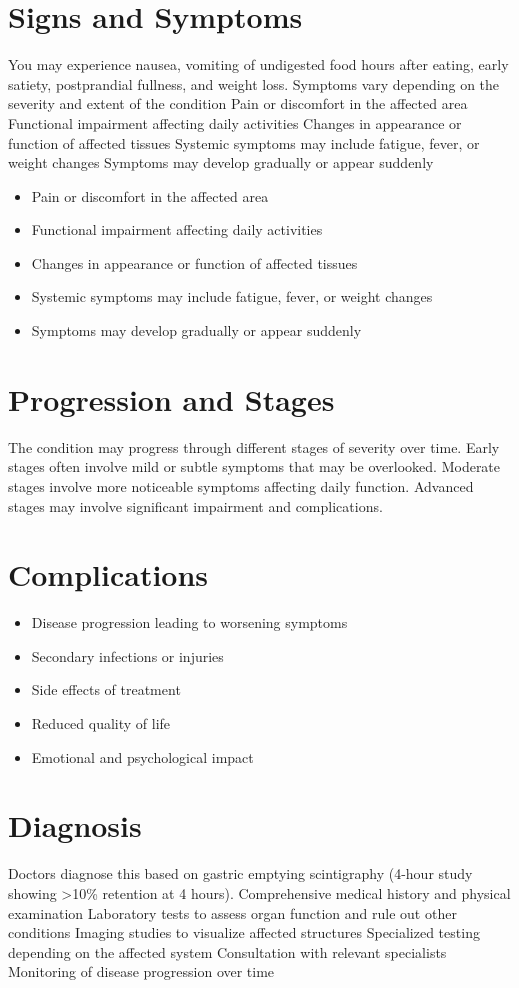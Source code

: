 \section{Signs and Symptoms}
You may experience nausea, vomiting of undigested food hours after eating, early satiety, postprandial fullness, and weight loss. Symptoms vary depending on the severity and extent of the condition Pain or discomfort in the affected area Functional impairment affecting daily activities Changes in appearance or function of affected tissues Systemic symptoms may include fatigue, fever, or weight changes Symptoms may develop gradually or appear suddenly

\begin{itemize}[noitemsep]
  \item Pain or discomfort in the affected area
  \item Functional impairment affecting daily activities
  \item Changes in appearance or function of affected tissues
  \item Systemic symptoms may include fatigue, fever, or weight changes
  \item Symptoms may develop gradually or appear suddenly
\end{itemize}
\section{Progression and Stages}
The condition may progress through different stages of severity over time. Early stages often involve mild or subtle symptoms that may be overlooked. Moderate stages involve more noticeable symptoms affecting daily function. Advanced stages may involve significant impairment and complications.
\section{Complications}
\begin{itemize}[noitemsep]
  \item Disease progression leading to worsening symptoms
  \item Secondary infections or injuries
  \item Side effects of treatment
  \item Reduced quality of life
  \item Emotional and psychological impact
\end{itemize}
\section{Diagnosis}
Doctors diagnose this based on gastric emptying scintigraphy (4-hour study showing >10\% retention at 4 hours). Comprehensive medical history and physical examination Laboratory tests to assess organ function and rule out other conditions Imaging studies to visualize affected structures Specialized testing depending on the affected system Consultation with relevant specialists Monitoring of disease progression over time

